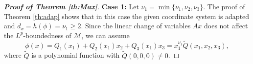 \documentclass[a4paper, 11pt]{article}
\theoremstyle{plain}
\theoremstyle{definition}
\theoremstyle{lemma}
\theoremstyle{Remark}
\theoremstyle{proposition}
\theoremstyle{corollary}
\theoremstyle{example}
\theoremstyle{assumption}
\begin{document}
\begin{proof}[\textbf{Proof of Theorem \ref{th:Max}}]
\textbf{Case 1:} Let $\nu_1= \min\{\nu_1,\nu_2,\nu_3\}.$
 The proof of Theorem \ref{th:adap} shows that in this case the given coordinate system is adapted
and  $d_x=h(\phi)=\nu_1\geq 2.$
Since the  linear change of variables  $Ax $ does not affect the $L^p$-boundedness of $\mathcal{M}$,  we can assume
\begin{equation*}\label{firstcase}
\phi(x)=Q_1(x_1)+Q_2(x_1)x_2+Q_3(x_1)x_3=x_1^{\nu_1}\tilde Q(x_1, x_2, x_3),
\end{equation*}
where $\tilde Q$ is a polynomial function with $\tilde Q(0, 0, 0)\neq0$.



\end{proof}
\end{document}
